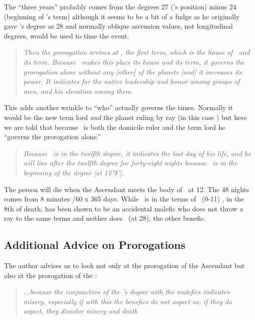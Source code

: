 The ``three years'' probably comes from the degrees 27 (\Venus's position) minus 24 (beginning of \Saturn's term) although it seems to be a bit of a fudge as he originally gave \Venus's degree as 28 and normally oblique ascension values, not longitudinal degrees, would be used to time the event.

\begin{quote}
\textsl{Then the prorogation arrives at \Sagittarius, the first term, which is the house of \Jupiter\, and its term. Because \Jupiter\, makes this place its house and its term, it governs the prorogation alone without any [other] of the planets [and] it increases its power. It indicates for the native leadership and honor among groups of men, and his elevation among them.}
\end{quote}

This adds another wrinkle to ``who'' actually governs the times. Normally it would be the new term lord \textsl{and} the planet ruling by ray (in this case \Venus) but here we are told that because \Jupiter\, is both the domicile ruler and the term lord he ``governs the prorogation alone.''

\begin{quote}
\textsl{Because \Saturn\, is in the twelfth degree, it indicates the last day of his life, and he will live after the twelfth degree for forty-eight nights because \Saturn\, is in the beginning of the degree [at 12°8'].}
\end{quote}

The person will die when the Ascendant meets the body of \Saturn\, at 12\Sagittarius. The 48 nights comes from 8 minutes /60 x 365 days. While \Saturn\, is in the terms of \Jupiter\, (0-11\Sagittarius) \Jupiter, in the 8th of death, has been shown to be an accidental malefic who does not throw a ray to the same terms and neither does \Venus\, (at 28\Leo), the other benefic.

\subsection{Additional Advice on Prorogations}
The author advises us to look not only at the prorogation of the Ascendant but also at the prorogation of the \Moon:
\begin{quote}
\textsl{...because the conjunction of the \Moon's degree with the malefics indicates misery, especially if with this the benefics do not aspect as, if they do aspect, they dissolve misery and death}
\end{quote}


